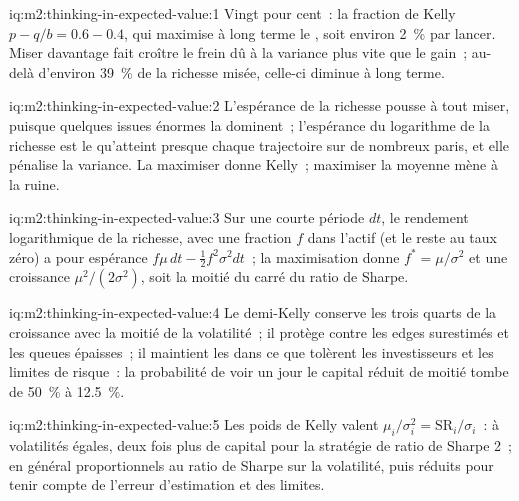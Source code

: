 \begin{solution}{iq:m2:thinking-in-expected-value:1}
Vingt pour cent~: la fraction de Kelly $p - q/b = 0.6 - 0.4$, qui maximise à long terme le
, soit environ 2~\% par lancer. Miser davantage fait croître le frein dû à la variance plus vite que le
gain~; au-delà d'environ 39~\% de la richesse misée, celle-ci diminue à long terme.
\end{solution}

\begin{solution}{iq:m2:thinking-in-expected-value:2}
L'espérance de la richesse pousse à tout miser, puisque quelques issues énormes la dominent~;
l'espérance du logarithme de la richesse est le  qu'atteint presque chaque trajectoire sur de nombreux paris,
et elle pénalise la variance. La maximiser donne Kelly~; maximiser la moyenne mène à la ruine.
\end{solution}

\begin{solution}{iq:m2:thinking-in-expected-value:3}
Sur une courte période $dt$, le rendement logarithmique de la richesse, avec une fraction $f$ dans l'actif (et
le reste au taux zéro) a pour espérance $f\mu\,dt - \tfrac12 f^2\sigma^2 dt$~; la maximisation donne $f^* =
\mu/\sigma^2$ et une croissance $\mu^2/(2\sigma^2)$, soit la moitié du carré du ratio de Sharpe.
\end{solution}

\begin{solution}{iq:m2:thinking-in-expected-value:4}
Le demi-Kelly conserve les trois quarts de la croissance avec la moitié de la volatilité~; il protège contre
les edges surestimés et les queues épaisses~; il maintient les  dans ce que tolèrent les investisseurs et
les limites de risque~: la probabilité de voir un jour le capital réduit de moitié tombe de 50~\% à 12.5~\%.
\end{solution}

\begin{solution}{iq:m2:thinking-in-expected-value:5}
Les poids de Kelly valent $\mu_i/\sigma_i^2 = \mathrm{SR}_i/\sigma_i$~: à volatilités égales,
deux fois plus de capital pour la stratégie de ratio de Sharpe 2~; en général proportionnels au ratio de Sharpe sur
la volatilité, puis réduits pour tenir compte de l'erreur d'estimation et des limites.
\end{solution}

